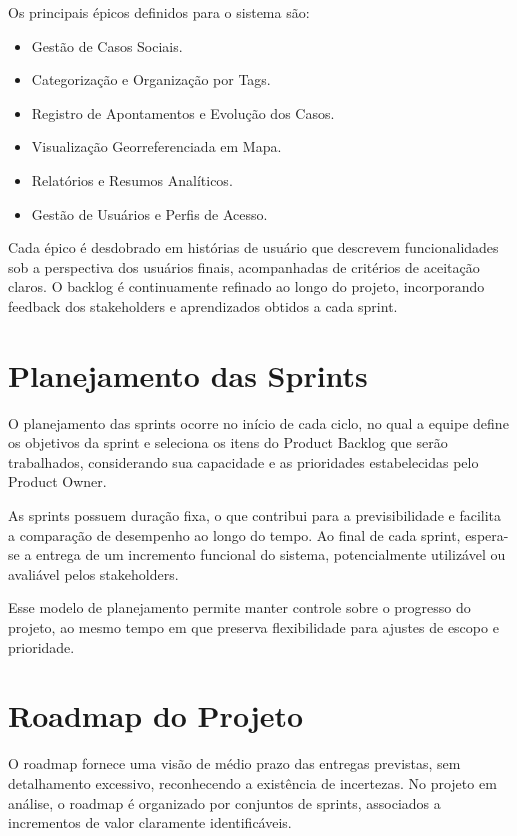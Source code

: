 Os principais épicos definidos para o sistema são:
\begin{itemize}
    \item Gestão de Casos Sociais.
    \item Categorização e Organização por Tags.
    \item Registro de Apontamentos e Evolução dos Casos.
    \item Visualização Georreferenciada em Mapa.
    \item Relatórios e Resumos Analíticos.
    \item Gestão de Usuários e Perfis de Acesso.
\end{itemize}

Cada épico é desdobrado em histórias de usuário que descrevem funcionalidades sob a perspectiva dos usuários finais, acompanhadas de critérios de aceitação claros. O backlog é continuamente refinado ao longo do projeto, incorporando feedback dos stakeholders e aprendizados obtidos a cada sprint.

\section{Planejamento das Sprints}

O planejamento das sprints ocorre no início de cada ciclo, no qual a equipe define os objetivos da sprint e seleciona os itens do Product Backlog que serão trabalhados, considerando sua capacidade e as prioridades estabelecidas pelo Product Owner.

As sprints possuem duração fixa, o que contribui para a previsibilidade e facilita a comparação de desempenho ao longo do tempo. Ao final de cada sprint, espera-se a entrega de um incremento funcional do sistema, potencialmente utilizável ou avaliável pelos stakeholders.

Esse modelo de planejamento permite manter controle sobre o progresso do projeto, ao mesmo tempo em que preserva flexibilidade para ajustes de escopo e prioridade.

\section{Roadmap do Projeto}

O roadmap fornece uma visão de médio prazo das entregas previstas, sem detalhamento excessivo, reconhecendo a existência de incertezas. No projeto em análise, o roadmap é organizado por conjuntos de sprints, associados a incrementos de valor claramente identificáveis.

